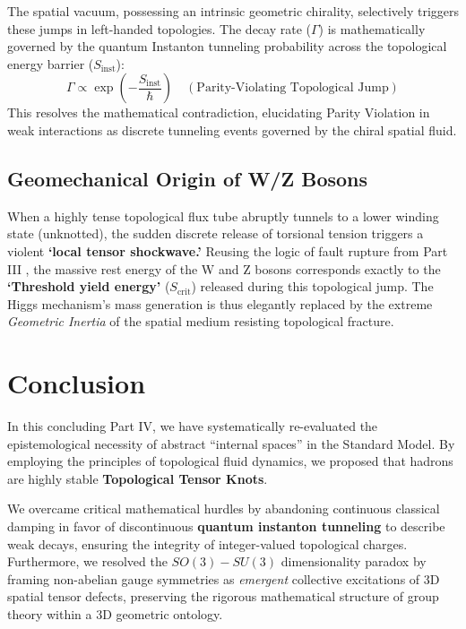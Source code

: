 \documentclass[reprint,amsmath,amssymb,aps,prd]{revtex4-2}
\begin{document}
The spatial vacuum, possessing an intrinsic geometric chirality, selectively triggers these jumps in left-handed topologies. The decay rate ($\Gamma$) is mathematically governed by the quantum Instanton tunneling probability across the topological energy barrier ($S_{\mathrm{inst}}$):
\begin{equation}
\Gamma \propto \exp\left( -\frac{S_{\mathrm{inst}}}{\hbar} \right) \quad (\text{Parity-Violating Topological Jump})
\end{equation}
This resolves the mathematical contradiction, elucidating Parity Violation in weak interactions \cite{Wu1957} as discrete tunneling events governed by the chiral spatial fluid.

\subsection{Geomechanical Origin of W/Z Bosons}
When a highly tense topological flux tube abruptly tunnels to a lower winding state (unknotted), the sudden discrete release of torsional tension triggers a violent \textbf{`local tensor shockwave.'} Reusing the logic of fault rupture from Part III \cite{YooPart3}, the massive rest energy of the W and Z bosons corresponds exactly to the \textbf{`Threshold yield energy'} ($S_{\mathrm{crit}}$) released during this topological jump. The Higgs mechanism's mass generation \cite{Higgs1964} is thus elegantly replaced by the extreme \textit{Geometric Inertia} of the spatial medium resisting topological fracture.

\section{Conclusion}

In this concluding Part IV, we have systematically re-evaluated the epistemological necessity of abstract ``internal spaces'' in the Standard Model. By employing the principles of topological fluid dynamics, we proposed that hadrons are highly stable \textbf{Topological Tensor Knots}.

We overcame critical mathematical hurdles by abandoning continuous classical damping in favor of discontinuous \textbf{quantum instanton tunneling} to describe weak decays, ensuring the integrity of integer-valued topological charges. Furthermore, we resolved the $SO(3)-SU(3)$ dimensionality paradox by framing non-abelian gauge symmetries as \textit{emergent} collective excitations of 3D spatial tensor defects, preserving the rigorous mathematical structure of group theory within a 3D geometric ontology. 
\end{document}
